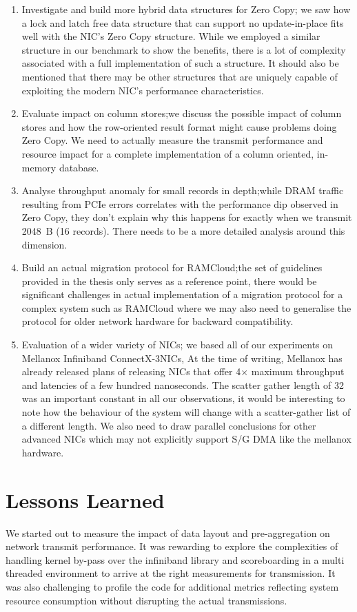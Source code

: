 \begin{enumerate}
\item Investigate and build more hybrid data structures for Zero Copy; we saw how a lock and latch free data structure that can support no update-in-place 
fits well with the NIC's Zero Copy structure. While we employed a similar structure in our benchmark to show the benefits, there is a lot of complexity associated 
with a full implementation of such a structure. It should also be mentioned that there may be other structures that are uniquely capable of exploiting the modern NIC's 
performance characteristics.
\item Evaluate impact on column stores;we discuss the possible impact of column stores and how the row-oriented result format might cause problems doing Zero Copy. We need 
to actually measure the transmit performance and resource impact for a complete implementation of a column oriented, in-memory database.
\item Analyse throughput anomaly for small records in depth;while DRAM traffic resulting from PCIe errors correlates with the performance dip observed in Zero Copy, 
they don't explain why this happens for exactly when we transmit 2048~B (16 records). There needs to be a more detailed analysis around this dimension.
\item Build an actual migration protocol for RAMCloud;the set of guidelines provided in the thesis only serves as a reference point, there would be significant challenges 
in actual implementation of a migration protocol for a complex system such as RAMCloud where we may also need to generalise the protocol for older network hardware for backward 
compatibility.
\item Evaluation of a wider variety of NICs; we based all of our experiments on Mellanox Infiniband ConnectX-3\textregistered NICs, At the time of writing, Mellanox has already 
released plans of releasing NICs that offer 4$\times$ maximum throughput and latencies of a few hundred nanoseconds. The scatter gather length of 32 was an important constant in 
all our observations, it would be interesting to note how the behaviour of the system will change with a scatter-gather list of a different length. We also need to draw parallel 
conclusions for other advanced NICs which may not explicitly support S/G DMA like the mellanox hardware.
\end{enumerate}

\section{Lessons Learned}
We started out to measure the impact of data layout and pre-aggregation on network transmit performance. 
It was rewarding to explore the complexities of handling kernel by-pass over the infiniband library and 
scoreboarding in a multi threaded environment to arrive at the right measurements for transmission.
It was also challenging to profile the code for additional metrics reflecting system resource consumption 
without disrupting the actual transmissions. 

